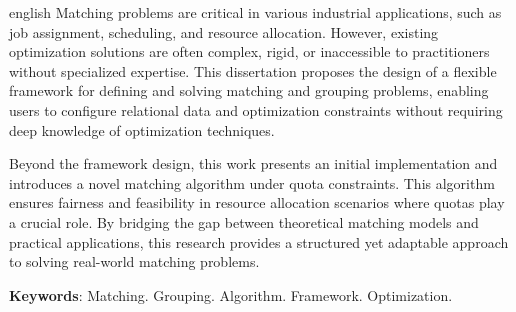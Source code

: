 
\begin{resumo}[Abstract]
 \begin{otherlanguage*}{english}
   Matching problems are critical in various industrial applications, such as job assignment, scheduling, and resource allocation. However, existing optimization solutions are often complex, rigid, or inaccessible to practitioners without specialized expertise. This dissertation proposes the design of a flexible framework for defining and solving matching and grouping problems, enabling users to configure relational data and optimization constraints without requiring deep knowledge of optimization techniques.

    Beyond the framework design, this work presents an initial implementation and introduces a novel matching algorithm under quota constraints. This algorithm ensures fairness and feasibility in resource allocation scenarios where quotas play a crucial role. By bridging the gap between theoretical matching models and practical applications, this research provides a structured yet adaptable approach to solving real-world matching problems.
    
   \textbf{Keywords}: Matching. Grouping. Algorithm. Framework. Optimization.
 \end{otherlanguage*}
\end{resumo}
